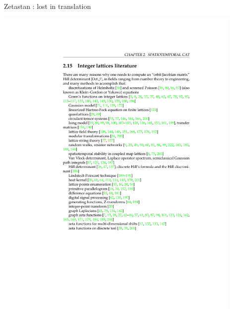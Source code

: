 \begin{frame}{Zetastan : lost in translation}
\begin{center}
\hfill\includegraphics[width=0.90\textwidth]{lattLitClip1}
\end{center}
\end{frame} %

